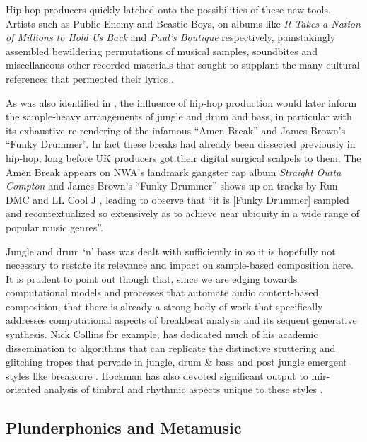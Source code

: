 Hip-hop producers quickly latched onto the possibilities of these new tools. Artists such as Public Enemy and Beastie Boys, on albums like \textit{It Takes a Nation of Millions to Hold Us Back} and \textit{Paul's Boutique} respectively, painstakingly assembled bewildering permutations of musical samples, soundbites and miscellaneous other recorded materials that sought to supplant the many cultural references that permeated their lyrics \citep{Sewell2013, Sewell2014}. 

As was also identified in , the influence of hip-hop production would later inform the sample-heavy arrangements of jungle and drum and bass, in particular with its exhaustive re-rendering of the infamous ``Amen Break'' and James Brown's ``Funky Drummer''. In fact these breaks had already been dissected previously in hip-hop, long before UK producers got their digital surgical scalpels to them. The Amen Break appears on NWA's landmark gangster rap album \textit{Straight Outta Compton} and James Brown's ``Funky Drummer'' shows up on tracks by Run DMC and LL Cool J \citep{Frane2017}, leading \cite{Oliver2015} to observe that ``it is [Funky Drummer] sampled and recontextualized so extensively as to achieve near ubiquity in a wide range of popular music genres''.

Jungle and drum `n' bass was dealt with sufficiently in  so it is hopefully not necessary to restate its relevance and impact on sample-based composition here. It is prudent to point out though that, since we are edging towards computational models and processes that automate audio content-based composition, that there is already a strong body of work that specifically addresses computational aspects of breakbeat analysis and its sequent generative synthesis. Nick Collins for example, has dedicated much of his academic dissemination to algorithms that can replicate the distinctive stuttering and glitching tropes that pervade in jungle, drum \& bass and post jungle emergent styles like breakcore \citep{Collins2001, Collins2002, Collins2006a}. Hockman has also devoted significant output to \acrshort{mir}-oriented analysis of timbral and rhythmic aspects unique to these styles \citep{Hockman2007, Hockman2012, Hockman2015}.

\pagebreak

\subsection{Plunderphonics and Metamusic}

